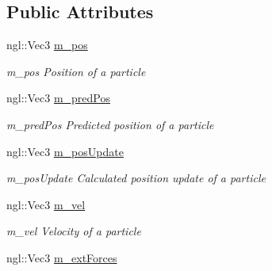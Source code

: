 \subsection*{Public Attributes}
\begin{DoxyCompactItemize}
\item 
ngl\+::\+Vec3 \hyperlink{structParticle_a2b5ef8d7207002ec8e887492a5bbe9f2}{m\+\_\+pos}\hypertarget{structParticle_a2b5ef8d7207002ec8e887492a5bbe9f2}{}\label{structParticle_a2b5ef8d7207002ec8e887492a5bbe9f2}

\begin{DoxyCompactList}\small\item\em m\+\_\+pos Position of a particle \end{DoxyCompactList}\item 
ngl\+::\+Vec3 \hyperlink{structParticle_a07d3e906cc3a72402264eef170928dc2}{m\+\_\+pred\+Pos}\hypertarget{structParticle_a07d3e906cc3a72402264eef170928dc2}{}\label{structParticle_a07d3e906cc3a72402264eef170928dc2}

\begin{DoxyCompactList}\small\item\em m\+\_\+pred\+Pos Predicted position of a particle \end{DoxyCompactList}\item 
ngl\+::\+Vec3 \hyperlink{structParticle_a0193dd643fac3bea35449487b6a01bb8}{m\+\_\+pos\+Update}\hypertarget{structParticle_a0193dd643fac3bea35449487b6a01bb8}{}\label{structParticle_a0193dd643fac3bea35449487b6a01bb8}

\begin{DoxyCompactList}\small\item\em m\+\_\+pos\+Update Calculated position update of a particle \end{DoxyCompactList}\item 
ngl\+::\+Vec3 \hyperlink{structParticle_a4098b3ed1500b5994784b1de15d19b34}{m\+\_\+vel}\hypertarget{structParticle_a4098b3ed1500b5994784b1de15d19b34}{}\label{structParticle_a4098b3ed1500b5994784b1de15d19b34}

\begin{DoxyCompactList}\small\item\em m\+\_\+vel Velocity of a particle \end{DoxyCompactList}\item 
ngl\+::\+Vec3 \hyperlink{structParticle_a71714f50096808645b525a035d1109cc}{m\+\_\+ext\+Forces}\hypertarget{structParticle_a71714f50096808645b525a035d1109cc}{}\label{structParticle_a71714f50096808645b525a035d1109cc}


\end{DoxyCompactItemize}
